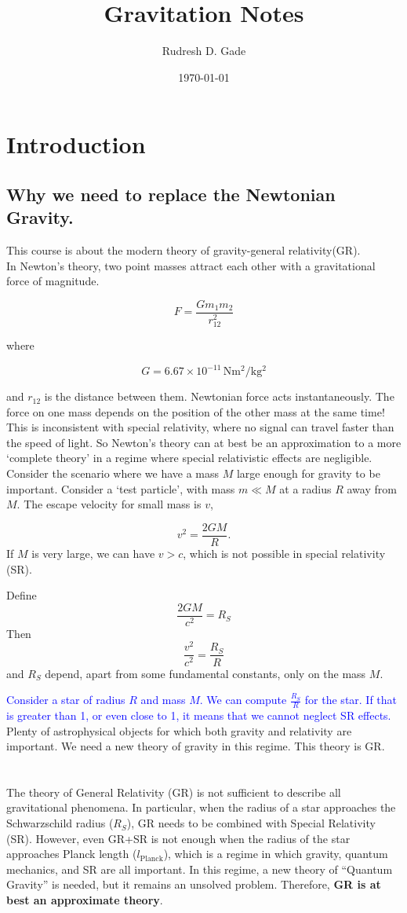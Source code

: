 \documentclass{article}
\title{Gravitation Notes}
\author{Rudresh D. Gade}
\date{\today}
\newcommand\note[1]{\textcolor{blue}{#1}}
\begin{document}
\maketitle
\tableofcontents

\newpage

\section{Introduction}
\subsection{Why we need to replace the Newtonian Gravity. }
This course is about the modern theory of gravity-general relativity(GR).
\\



In Newton's theory, two point masses attract each other with a gravitational force of magnitude.


$$F = \frac{Gm_1m_2}{r_{12}^2}$$


where


$$G = 6.67 \times 10^{-11} \, \mathrm{Nm^2/kg^2}$$


and $r_{12}$ is the distance between them. Newtonian force acts instantaneously. The force on one mass depends on the position of the other mass at the same time! This is inconsistent with special relativity, where no signal can travel faster than the speed of light. So Newton's theory can at best be an approximation to a more `complete theory' in a regime where special relativistic effects are negligible.
\\
Consider the scenario where we have a mass $M$ large enough for gravity to be important. Consider a `test particle', with mass $m \ll M$ at a radius $R$ away from $M$. The escape velocity for small mass is $v$,


$$v^2 = \frac{2GM}{R}.$$ If $M$ is very large, we can have $v > c$, which is not possible in special relativity (SR).


Define $$\frac{2GM}{c^2} = R_S$$ Then $$\frac{v^2}{c^2} = \frac{R_S}{R}$$ and $R_S$ depend, apart from some fundamental constants, only on the mass $M$.


\note{Consider a star of radius $R$ and mass $M$. We can compute $\frac{R_S}{R}$ for the star. If that is greater than 1, or even close to 1, it means that we cannot neglect SR effects.} 
Plenty of astrophysical objects for which both gravity and relativity are important. We need a new theory of gravity in this regime. This theory is GR.
\\ \\ \\
The theory of General Relativity (GR) is not sufficient to describe all gravitational phenomena. In particular, when the radius of a star approaches the Schwarzschild radius ($R_S$), GR needs to be combined with Special Relativity (SR). However, even GR+SR is not enough when the radius of the star approaches Planck length ($l_\text{Planck}$), which is a regime in which gravity, quantum mechanics, and SR are all important. In this regime, a new theory of ``Quantum Gravity'' is needed, but it remains an unsolved problem. Therefore, \textbf{GR is at best an approximate theory}.
\end{document}
